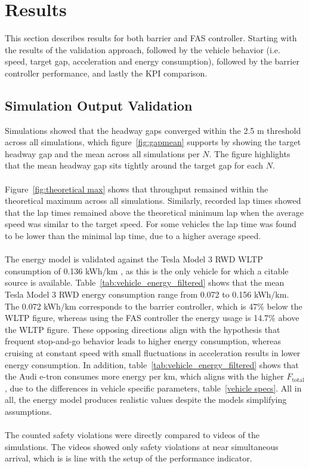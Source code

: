 

\section{Results}
\label{Results}
This section describes results for both barrier and FAS controller. Starting with the results of the validation approach, followed by the vehicle behavior (i.e. speed, target gap, acceleration and energy consumption), followed by the barrier controller performance, and lastly the KPI comparison.

\subsection{Simulation Output Validation}
Simulations showed that the headway gaps converged within the 2.5 m threshold across all simulations, which figure~\ref{fig:gapmean} supports by showing the target headway gap and the mean across all simulations per \(N\). The figure highlights that the mean headway gap sits tightly around the target gap for each \(N\).\\\\
Figure~\ref{fig:theoretical max} shows that throughput remained within the theoretical maximum across all simulations. Similarly, recorded lap times showed that the lap times remained above the theoretical minimum lap when the average speed was similar to the target speed. For some vehicles the lap time was found to be lower than the minimal lap time, due to a higher average speed. 
\\\\
The energy model is validated against the Tesla Model 3 RWD WLTP consumption of 0.136 kWh/km \parencite{rosenberger2024quantifying}, as this is the only vehicle for which a citable source is available. Table~\ref{tab:vehicle_energy_filtered} shows that the mean Tesla Model 3 RWD energy consumption range from 0.072 to 0.156 kWh/km. The 0.072 kWh/km corresponds to the barrier controller, which is 47\% below the WLTP figure, whereas using the FAS controller the energy usage is 14.7\% above the WLTP figure. These opposing directions align with the hypothesis that frequent stop-and-go behavior leads to higher energy consumption, whereas cruising at constant speed with small fluctuations in acceleration results in lower energy consumption. In addition, table~\ref{tab:vehicle_energy_filtered} shows that the Audi e-tron consumes more energy per km, which aligns with the higher \(F_\text{total}\), due to the differences in vehicle specific parameters, table~\ref{vehicle specs}.  All in all, the energy model produces realistic values despite the models simplifying assumptions.
\\\\
The counted safety violations were directly compared to videos of the simulations. The videos showed only safety violations at near simultaneous arrival, which is is line with the setup of the performance indicator.  


